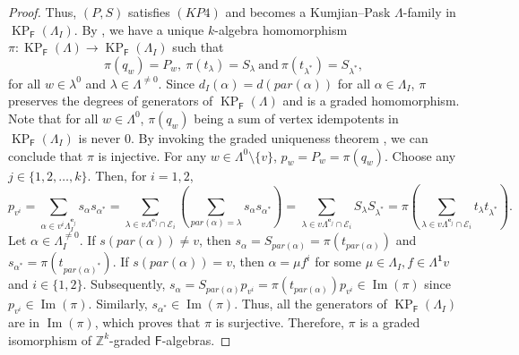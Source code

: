 \documentclass[12pt]{amsart}
\newcommand{\KP}{\operatorname{KP}}
\theoremstyle{definition}
\theoremstyle{remark}
\newcommand{\image}{\operatorname{Im}}
\begin{document}
\begin{proof}
Thus, $(P,S)$ satisfies $(KP4)$ and becomes a Kumjian--Pask $\Lambda$-family in $\KP_\mathsf{F}(\Lambda_I)$. By \cite[Theorem 3.4]{Pino}, we have a unique $k$-algebra homomorphism $\pi:\KP_\mathsf{F}(\Lambda)\longrightarrow \KP_\mathsf{F}(\Lambda_I)$ such that \[\pi(q_w)=P_w,~\pi(t_\lambda)=S_\lambda~\text{and}~\pi(t_{\lambda^*})=S_{\lambda^*},\] for all $w\in \lambda^0$ and $\lambda\in \Lambda^{\neq 0}$. Since $d_I(\alpha)=d(par(\alpha))$ for all $\alpha\in \Lambda_I$, $\pi$ preserves the degrees of generators of $\KP_\mathsf{F}(\Lambda)$ and is a graded homomorphism. Note that for all $w\in \Lambda^0$, $\pi(q_w)$ being a sum of vertex idempotents in $\KP_\mathsf{F}(\Lambda_I)$ is never $0$. By invoking the graded uniqueness theorem \cite[Theorem 4.1]{Pino}, we can conclude that $\pi$ is injective. For any $w\in \Lambda^0\setminus \{v\}$, $p_w=P_w=\pi(q_w)$. Choose any $j\in \{1,2,\ldots,k\}$. Then, for $i=1,2$, \[p_{v^i}=\displaystyle{\sum_{\alpha\in v^i\Lambda_I^{\mathbf{e}_j}}} s_\alpha s_{\alpha^*}=\displaystyle{\sum_{\lambda\in v\Lambda^{\mathbf{e}_j}\cap \mathcal{E}_i}} \left(\displaystyle{\sum_{par(\alpha)=\lambda}} s_\alpha s_{\alpha^*}\right)=\displaystyle{\sum_{\lambda\in v\Lambda^{\mathbf{e}_j}\cap \mathcal{E}_i}}S_\lambda S_{\lambda^*}=\pi\left(\displaystyle{\sum_{\lambda\in v\Lambda^{\mathbf{e}_j}\cap \mathcal{E}_i}} t_\lambda t_{\lambda^*}\right).\] Let $\alpha\in \Lambda_I^{\neq 0}$. If $s(par(\alpha))\neq v$, then $s_\alpha=S_{par(\alpha)}=\pi(t_{par(\alpha)})$ and $s_{\alpha^*}=\pi(t_{par(\alpha)^*})$. If $s(par(\alpha))=v$, then $\alpha=\mu f^i$ for some $\mu\in \Lambda_I, f\in \Lambda^\mathbf{1} v$ and $i\in \{1,2\}$. Subsequently, $s_\alpha=S_{par(\alpha)}p_{v^i}=\pi(t_{par(\alpha)})p_{v^i}\in \image(\pi)$ since $p_{v^i}\in \image(\pi)$. Similarly, $s_{\alpha^*}\in \image(\pi)$. Thus, all the generators of $\KP_\mathsf{F}(\Lambda_I)$ are in $\image(\pi)$, which proves that $\pi$ is surjective. Therefore, $\pi$ is a graded isomorphism of $\mathbb{Z}^k$-graded $\mathsf{F}$-algebras. 
\end{proof}
\end{document}
